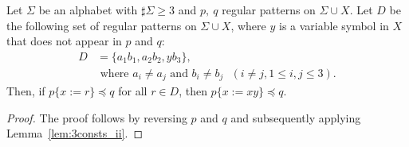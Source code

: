 
\begin{lem}\label{lem:3consts_iii}
  Let $\Sigma$ be an alphabet with $\sharp\Sigma \ge 3$ and $p,~q$ regular patterns on $\Sigma\cup X$.
  Let $D$ be the following set of regular patterns on $\Sigma\cup X$, where $y$ is a variable symbol in $X$ that does not appear in $p$ and $q$:
  \begin{align*}
  D & = \{ a_{1}b_{1}, a_{2}b_{2}, yb_{3}\},\\
  & \mbox{ where } a_{i} \ne a_{j} \mbox{ and } b_{i} \ne b_{j} \mbox{ } (i\ne j, 1\le i,j\le 3).
  \end{align*}
  Then, if $p \{ x := r \} \preceq q$ for all $r \in D$, then $p \{ x := xy \} \preceq q$.
\end{lem}

\begin{proof}
%
%
The proof follows by reversing $p$ and $q$ and subsequently applying Lemma~\ref{lem:3consts_ii}.
\end{proof}
